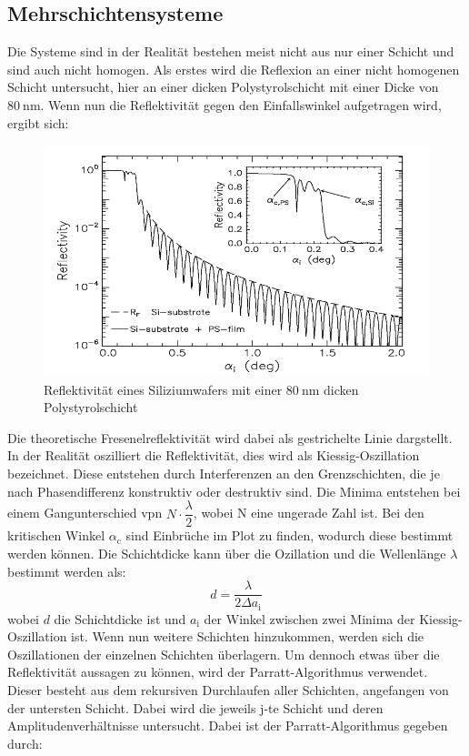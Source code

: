 \subsection{Mehrschichtensysteme}
\label{sec:Mehrschichtensysteme}
Die Systeme  sind in der Realität bestehen meist nicht aus nur einer Schicht und sind auch nicht homogen. Als erstes wird die Reflexion an einer nicht homogenen Schicht untersucht, hier an einer  dicken Polystyrolschicht mit einer Dicke von $\SI{80}{\nano\meter}$. Wenn nun die Reflektivität gegen den Einfallswinkel aufgetragen wird, ergibt sich:
\begin{figure}[h!]
  \label{fig:kiessig}
  \centering
  \includegraphics[scale=0.4]{fig/kiessing.png}
  \caption{Reflektivität eines Siliziumwafers mit einer $\SI{80}{\nano\meter}$ dicken Polystyrolschicht \cite[8]{Anleitung3}}
\end{figure}
\FloatBarrier
\noindent Die theoretische Fresenelreflektivität wird dabei als gestrichelte Linie dargstellt. In der Realität oszilliert die Reflektivität, dies wird als Kiessig-Oszillation bezeichnet. Diese entstehen durch Interferenzen an den Grenzschichten, die je nach Phasendifferenz konstruktiv oder destruktiv sind. Die Minima entstehen bei einem Gangunterschied vpn $N\cdot\dfrac{\lambda}{2}$, wobei N eine ungerade Zahl ist. Bei den kritischen Winkel $\alpha_\mathrm{c}$ sind Einbrüche im Plot zu finden, wodurch diese bestimmt werden können. Die Schichtdicke kann über die Ozillation und die Wellenlänge $\lambda$ bestimmt werden als:
\begin{equation}
  \label{eqn:Schichtdicke}
d = \dfrac{\lambda}{2\Delta a_\mathrm{i}}
\end{equation}
wobei $d$ die Schichtdicke ist und  $a_\mathrm{i}$ der Winkel zwischen zwei Minima der Kiessig-Oszillation ist.
Wenn nun weitere Schichten hinzukommen, werden sich die Oszillationen der einzelnen Schichten überlagern. Um dennoch etwas über die Reflektivität aussagen zu können, wird der Parratt-Algorithmus verwendet. Dieser besteht aus dem rekursiven Durchlaufen aller Schichten, angefangen von der untersten Schicht. Dabei wird die jeweils j-te Schicht und deren Amplitudenverhältnisse untersucht. Dabei ist der Parratt-Algorithmus gegeben durch:
